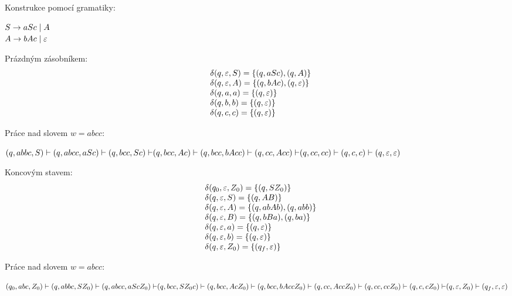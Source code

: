 Konstrukce pomocí gramatiky: 

$\medskip S \to aSc \mid A$\\
$\medskip A \to bAc \mid \varepsilon$

\begin{multicols}{2}
    
    Prázdným zásobníkem: 
    \[
    \begin{array}{l l}
        & \delta(q, \varepsilon, S) = \left\lbrace (q, aSc), (q, A) \right\rbrace \\
        & \delta(q, \varepsilon, A) = \left\lbrace (q, bAc), (q, \varepsilon) \right\rbrace \\
        & \delta(q, a, a) = \left\lbrace (q, \varepsilon) \right\rbrace \\
        & \delta(q, b, b) = \left\lbrace (q, \varepsilon) \right\rbrace \\ 
        & \delta(q, c, c) = \left\lbrace (q, \varepsilon) \right\rbrace \\ 
    \end{array}
    \]

    Práce nad slovem $w = abcc$:

    $
    {(q, abbc, S) \vdash (q, abcc, aSc) \vdash (q, bcc, Sc) \vdash}\\
    {(q, bcc, Ac) \vdash (q, bcc, bAcc) \vdash (q, cc, Acc) \vdash}\\ 
    {(q, cc, cc) \vdash (q, c, c) \vdash(q, \varepsilon, \varepsilon)}
    $

\columnbreak

    Koncovým stavem: 
    \[
    \begin{array}{l l}
        & \delta(q_0, \varepsilon, Z_0) = \left\lbrace (q, SZ_0) \right\rbrace \\
        & \delta(q, \varepsilon, S) = \left\lbrace (q, AB) \right\rbrace \\
        & \delta(q, \varepsilon, A) = \left\lbrace (q, abAb), (q, abb) \right\rbrace \\
        & \delta(q, \varepsilon, B) = \left\lbrace (q, bBa), (q, ba) \right\rbrace \\
        & \delta(q, \varepsilon, a) = \left\lbrace (q, \varepsilon) \right\rbrace \\
        & \delta(q, \varepsilon, b) = \left\lbrace (q, \varepsilon) \right\rbrace \\ 
        & \delta(q, \varepsilon, Z_0) = \left\lbrace (q_f, \varepsilon) \right\rbrace \\ 
    \end{array}
    \]

    Práce nad slovem $w = abcc$:

    $
    {(q_0, abc, Z_0) \vdash (q, abbc, SZ_0) \vdash (q, abcc, aScZ_0) \vdash}\\
    {(q, bcc, SZ_0c) \vdash (q, bcc, AcZ_0) \vdash (q, bcc, bAccZ_0)}\\ \vdash
    {(q, cc, AccZ_0) \vdash ( q, cc, ccZ_0) \vdash (q, c, cZ_0) \vdash}\\
    (q, \varepsilon, Z_0) \vdash (q_f, \varepsilon, \varepsilon)
    $
\end{multicols}

